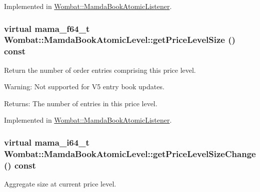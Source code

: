 Implemented in \hyperlink{classWombat_1_1MamdaBookAtomicListener_a71f90d4ad1c3297f35676b7a4363488}{Wombat::Mamda\-Book\-Atomic\-Listener}.\hypertarget{classWombat_1_1MamdaBookAtomicLevel_bf9d9609a53a7344d6232ba70407d069}{
\subsubsection[getPriceLevelSize]{\setlength{\rightskip}{0pt plus 5cm}virtual mama\_\-f64\_\-t Wombat::Mamda\-Book\-Atomic\-Level::get\-Price\-Level\-Size () const}}
\label{classWombat_1_1MamdaBookAtomicLevel_bf9d9609a53a7344d6232ba70407d069}


Return the number of order entries comprising this price level. 

\begin{Desc}
\item[Warning:]Not supported for V5 entry book updates.\end{Desc}
\begin{Desc}
\item[Returns:]The number of entries in this price level. \end{Desc}


Implemented in \hyperlink{classWombat_1_1MamdaBookAtomicListener_9bb50db078f337545e39e94cfcb89f0e}{Wombat::Mamda\-Book\-Atomic\-Listener}.\hypertarget{classWombat_1_1MamdaBookAtomicLevel_55c19ae02d863ce2007f4332af271f9b}{
\subsubsection[getPriceLevelSizeChange]{\setlength{\rightskip}{0pt plus 5cm}virtual mama\_\-i64\_\-t Wombat::Mamda\-Book\-Atomic\-Level::get\-Price\-Level\-Size\-Change () const}}
\label{classWombat_1_1MamdaBookAtomicLevel_55c19ae02d863ce2007f4332af271f9b}


Aggregate size at current price level. 

